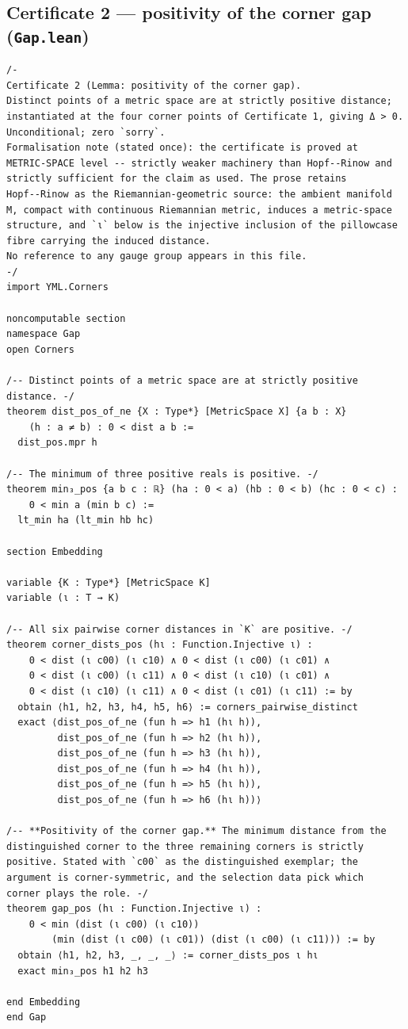 \documentclass[11pt,a4paper]{article}
\theoremstyle{plain}
\theoremstyle{definition}
\theoremstyle{remark}
\begin{document}
\subsection*{Certificate 2 --- positivity of the corner gap (\texttt{Gap.lean})}
\begin{Verbatim}[fontsize=\footnotesize,breaklines=true,breakanywhere=true,formatcom=\leanmono]
/-
Certificate 2 (Lemma: positivity of the corner gap).
Distinct points of a metric space are at strictly positive distance;
instantiated at the four corner points of Certificate 1, giving Δ > 0.
Unconditional; zero `sorry`.
Formalisation note (stated once): the certificate is proved at
METRIC-SPACE level -- strictly weaker machinery than Hopf--Rinow and
strictly sufficient for the claim as used. The prose retains
Hopf--Rinow as the Riemannian-geometric source: the ambient manifold
M, compact with continuous Riemannian metric, induces a metric-space
structure, and `ι` below is the injective inclusion of the pillowcase
fibre carrying the induced distance.
No reference to any gauge group appears in this file.
-/
import YML.Corners

noncomputable section
namespace Gap
open Corners

/-- Distinct points of a metric space are at strictly positive
distance. -/
theorem dist_pos_of_ne {X : Type*} [MetricSpace X] {a b : X}
    (h : a ≠ b) : 0 < dist a b :=
  dist_pos.mpr h

/-- The minimum of three positive reals is positive. -/
theorem min₃_pos {a b c : ℝ} (ha : 0 < a) (hb : 0 < b) (hc : 0 < c) :
    0 < min a (min b c) :=
  lt_min ha (lt_min hb hc)

section Embedding

variable {K : Type*} [MetricSpace K]
variable (ι : T → K)

/-- All six pairwise corner distances in `K` are positive. -/
theorem corner_dists_pos (hι : Function.Injective ι) :
    0 < dist (ι c00) (ι c10) ∧ 0 < dist (ι c00) (ι c01) ∧
    0 < dist (ι c00) (ι c11) ∧ 0 < dist (ι c10) (ι c01) ∧
    0 < dist (ι c10) (ι c11) ∧ 0 < dist (ι c01) (ι c11) := by
  obtain ⟨h1, h2, h3, h4, h5, h6⟩ := corners_pairwise_distinct
  exact ⟨dist_pos_of_ne (fun h => h1 (hι h)),
         dist_pos_of_ne (fun h => h2 (hι h)),
         dist_pos_of_ne (fun h => h3 (hι h)),
         dist_pos_of_ne (fun h => h4 (hι h)),
         dist_pos_of_ne (fun h => h5 (hι h)),
         dist_pos_of_ne (fun h => h6 (hι h))⟩

/-- **Positivity of the corner gap.** The minimum distance from the
distinguished corner to the three remaining corners is strictly
positive. Stated with `c00` as the distinguished exemplar; the
argument is corner-symmetric, and the selection data pick which
corner plays the role. -/
theorem gap_pos (hι : Function.Injective ι) :
    0 < min (dist (ι c00) (ι c10))
        (min (dist (ι c00) (ι c01)) (dist (ι c00) (ι c11))) := by
  obtain ⟨h1, h2, h3, _, _, _⟩ := corner_dists_pos ι hι
  exact min₃_pos h1 h2 h3

end Embedding
end Gap
\end{Verbatim}
\end{document}
